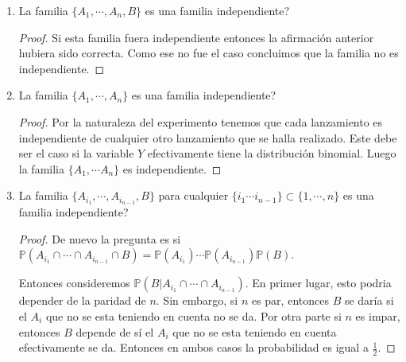 \documentclass[paper=letter, fontsize=11pt]{scrartcl} %
\numberwithin{equation}{section} %
\numberwithin{figure}{section} %
\numberwithin{table}{section} %
\newcommand{\prob}[1]{\mathbb{P}(#1)}
\begin{document}
\begin{enumerate}[label = \arabic*)]
\begin{proof}
Y en los puntos anteriores ya calculamos valores para las probabilidades de estos eventos.

\begin{eqnarray}
\prob{A_1 \cap \cdots \cap A_n \cap B }&=& \prob{A_1}\prob{A_2}\cdots\prob{A_n}\prob{B|A_1 \cap A_2 \cap \cdots \cap A_n} \nonumber
\\&=& \frac{1}{2}\frac{1}{2}\cdots\frac{1}{2}\frac{(-1)^n+1}{2} = \frac{(-1)^n+1}{2^{n+1}} \nonumber
\end{eqnarray}

Entonces concluimos que la afirmación no es correcta puesto que el resultado que predice es $ \mathbb{P}(A_1) \cdots \mathbb{P}(A_n)\mathbb{P}(B) = \frac{1}{2^{n+1}}  $ que es general diferente a lo mostrado anteriormente.
\end{proof}
\item La familia $ \{A_1, \cdots,A_n,B \} $ es una familia independiente?
\begin{proof}

Si esta familia fuera independiente entonces la afirmación anterior hubiera sido correcta. Como ese no fue el caso concluimos que la familia no es independiente.
\end{proof}


\item La familia $ \{A_1,\cdots, A_n \} $ es una familia independiente?

\begin{proof}
Por la naturaleza del experimento tenemos que cada lanzamiento es independiente de cualquier otro lanzamiento que se halla realizado. Este debe ser el caso si la variable $ Y $ efectivamente tiene la distribución binomial. Luego la familia $ \{A_1,\cdots A_n\} $ es independiente.
\end{proof}

\item La familia $ \{A_{i_1},\cdots, A_{i_{n-1}},B \} $ para cualquier $ \{ i_1 \cdots i_{n-1} \} \subset \{1,\cdots, n\} $ es una familia independiente?

\begin{proof}
De nuevo la pregunta es si $ \prob{A_{i_{1}} \cap \cdots \cap A_{i_{n-1}} \cap B} = \prob{A_{i_1}}\cdots \prob{A_{i_{n-1}}}\prob{B} $.

Entonces consideremos $ \prob{B|A_{i_{1}} \cap \cdots \cap A_{i_{n-1}}}$. En primer lugar, esto podria depender de la paridad de $ n $. Sin embargo, si $ n $ es par, entonces $ B $ se daría si el $ A_i $ que no se esta teniendo en cuenta no se da. Por otra parte si $ n $ es impar, entonces $ B $ depende de sí el $ A_i $ que no se esta teniendo en cuenta efectivamente se da. Entonces en ambos casos la probabilidad es igual a $ \frac{1}{2} $.


\end{proof}
\end{enumerate}
\end{document}
